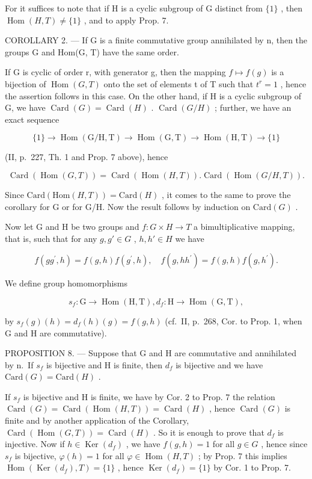 For it suffices to note that if H is a cyclic subgroup of G distinct from \(\{1\}\) , then \(\operatorname{Hom}(H, T) \neq \{1\}\) , and to apply Prop. 7.

COROLLARY 2. --- If G is a finite commutative group annihilated by n, then the groups G and Hom(G, T) have the same order.

If G is cyclic of order r, with generator g, then the mapping \(f \mapsto f(g)\) is a bijection of \(\operatorname{Hom}(G, T)\) onto the set of elements t of T such that \(t^{r} = 1\) , hence the assertion follows in this case. On the other hand, if H is a cyclic subgroup of G, we have \(\operatorname{Card}(G) = \operatorname{Card}(H)\) . \(\operatorname{Card}(G/H)\) ; further, we have an exact sequence

\[
\{1 \} \rightarrow \operatorname{Hom} (\mathrm{G} / \mathrm{H}, \mathrm{T}) \rightarrow \operatorname{Hom} (\mathrm{G}, \mathrm{T}) \rightarrow \operatorname{Hom} (\mathrm{H}, \mathrm{T}) \rightarrow \{1 \}
\]

(II, p.~227, Th. 1 and Prop. 7 above), hence

\[
\operatorname{Card} (\operatorname{Hom} (G, T)) = \operatorname{Card} (\operatorname{Hom} (H, T)). \operatorname{Card} (\operatorname{Hom} (G / H, T)).
\]

Since \(\text{Card}(\text{Hom}(H, T)) = \text{Card}(H)\) , it comes to the same to prove the corollary for G or for G/H. Now the result follows by induction on \(\text{Card}(G)\) .

Now let G and H be two groups and \(f: G \times H \to T\) a bimultiplicative mapping, that is, such that for any \(g, g' \in G\) , \(h, h' \in H\) we have

\[
f (g g ^ {\prime}, h) = f (g, h) f (g ^ {\prime}, h), \quad f (g, h h ^ {\prime}) = f (g, h) f (g, h ^ {\prime}).
\]

We define group homomorphisms

\[
s _ {f} \colon \mathrm{G} \to \operatorname{Hom} (\mathrm{H}, \mathrm{T}), d _ {f} \colon \mathrm{H} \to \operatorname{Hom} (\mathrm{G}, \mathrm{T}),
\]

by \(s_f(g)(h) = d_f(h)(g) = f(g, h)\) (cf.~II, p.~268, Cor. to Prop. 1, when G and H are commutative).

PROPOSITION 8. --- Suppose that G and H are commutative and annihilated by n.~If \(s_{f}\) is bijective and H is finite, then \(d_{f}\) is bijective and we have \(\text{Card}(G) = \text{Card}(H)\) .

If \(s_{f}\) is bijective and H is finite, we have by Cor. 2 to Prop. 7 the relation \(\operatorname{Card}(G) = \operatorname{Card}(\operatorname{Hom}(H, T)) = \operatorname{Card}(H)\) , hence \(\operatorname{Card}(G)\) is finite and by another application of the Corollary, \(\operatorname{Card}(\operatorname{Hom}(G, T)) = \operatorname{Card}(H)\) . So it is enough to prove that \(d_{f}\) is injective. Now if \(h \in \operatorname{Ker}(d_{f})\) , we have \(f(g, h) = 1\) for all \(g \in G\) , hence since \(s_{f}\) is bijective, \(\varphi(h) = 1\) for all \(\varphi \in \operatorname{Hom}(H, T)\) ; by Prop. 7 this implies \(\operatorname{Hom}(\operatorname{Ker}(d_{f}), T) = \{1\}\) , hence \(\operatorname{Ker}(d_{f}) = \{1\}\) by Cor. 1 to Prop. 7.

